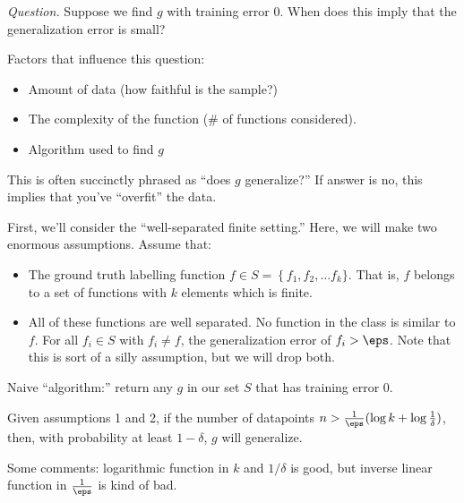 {\it Question.} Suppose we find $g$ with training error 0.  When does this imply that the generalization error is small?

Factors that influence this question:

\begin{itemize}
  \item Amount of data (how faithful is the sample?)
  \item The complexity of the function (\# of functions considered).
  \item Algorithm used to find $g$
\end{itemize}

This is often succinctly phrased as ``does $g$ generalize?''  If answer is no, this implies that you've ``overfit'' the data.

First, we'll consider the ``well-separated finite setting.''  Here, we will make two enormous assumptions.  Assume that:

\begin{itemize}
  \item The ground truth labelling function $f \in S = \left\{ f_1, f_2, \dots f_k \}$.  That is, $f$ belongs to a set of functions with $k$ elements which is finite.
  \item All of these functions are well separated.  No function in the class is similar to $f$.  For all $f_i \in S$ with $f_i \neq f$, the generalization error of $f_i > \eps$.  Note that this is sort of a silly assumption, but we will drop both.
\end{itemize}

Naive ``algorithm:'' return any $g$ in our set $S$ that has training error 0.

\begin{theorem}
  Given assumptions 1 and 2, if the number of datapoints $n > \frac{1}{\eps} (\log k + \log \frac{1}{\delta} )$, then, with probability at least $1 - \delta$, $g$ will generalize.
\end{theorem}

Some comments: logarithmic function in $k$ and $1/\delta$ is good, but inverse linear function in $\frac{1}{ \eps}$ is kind of bad.

